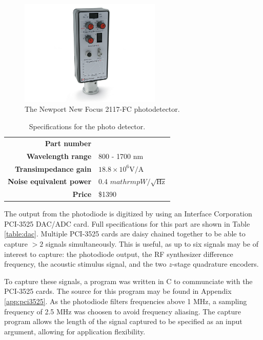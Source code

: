 \begin{figure}[h!]

\centering
\includegraphics[width=0.6\textwidth]{Images/System/pd.jpg}
\caption{The Newport New Focus 2117-FC photodetector.}
\end{figure}

\begin{table}[h!]
\centering
\begin{tabular}{ >{\bf}r | l}
Part number & \\
Wavelength range & 800 - 1700 nm \\
Transimpedance gain & $18.8 \times 10^6 \mathrm{V/A}$ \\
Noise equivalent power & 0.4 $mathrm{pW}/\sqrt{\mathrm{Hz}}$ \\
Price & \$1390 \\
\end{tabular}
\caption{Specifications for the photo detector. \label{table:pd}}
\end{table}

The output from the photodiode is digitized by using an Interface Corporation PCI-3525 DAC/ADC card. Full specifications for this part are shown in Table \ref{table:dac}. Multiple PCI-3525 cards are daisy chained together to be able to capture $>2$ signals simultaneously. This is useful, as up to six signals may be of interest to capture: the photodiode output, the RF synthesizer difference frequency, the acoustic stimulus signal, and the two $z$-stage quadrature encoders.

To capture these signals, a program was written in C to communciate with the PCI-3525 cards. The source for this program may be found in Appendix \ref{app:pci3525}. As the photodiode filters frequencies above 1 MHz, a sampling frequency of 2.5 MHz was choosen to avoid frequency aliasing. The capture program allows the length of the signal captured to be specified as an input argument, allowing for application flexibility.

